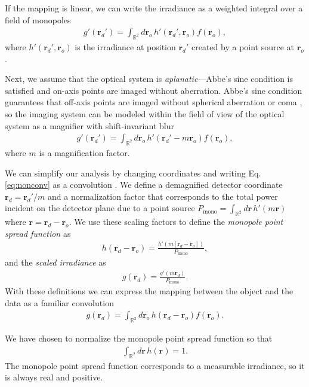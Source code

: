 \documentclass[]{osa-article}
\providecommand{\mb}[1]{\mathbf{#1}}
\providecommand{\ro}{\mathbf{\mathbf{r}}_o}
\providecommand{\rd}{\mathbf{r}_d}
\providecommand{\mbb}[1]{\mathbb{#1}}
\begin{document}
If the mapping is linear, we can write the irradiance as a weighted integral
over a field of monopoles
\begin{align}
g'(\rd') = \int_{\mbb{R}^2}d\ro\, h'(\rd',\ro)f(\ro), \label{eq:fwdmono}
\end{align}
where $h'(\rd', \ro{})$ is the irradiance at position $\rd'$ created by a
point source at $\ro$.

Next, we assume that the optical system is \textit{aplanatic}---Abbe's sine
condition is satisfied and on-axis points are imaged without aberration. Abbe's
sine condition guarantees that off-axis points are imaged without spherical
aberration or coma \cite[ch.~1]{mansuripur2009}, so the imaging system can
be modeled within the field of view of the optical system as a magnifier with
shift-invariant blur
\begin{align}
  g'(\rd') = \int_{\mbb{R}^2}d\ro\, h'(\rd' - m\ro)f(\ro), \label{eq:nonconv}
\end{align}
where $m$ is a magnification factor. 

We can simplify our analysis by changing coordinates and writing Eq.
\eqref{eq:nonconv} as a convolution \cite[ch.~7.2.7]{barrett2004}. We
define a demagnified detector coordinate $\rd = \rd'/m$ and a normalization
factor that corresponds to the total power incident on the detector plane due to
a point source $P_{\text{mono}} = \int_{\mbb{R}^2}d\mb{r}\,h'(m\mb{r})$ where
$\mb{r} = \rd - \ro$. We use these scaling factors to define the
\textit{monopole point spread function} as
\begin{align}
  h(\rd - \ro) = \frac{h'(m[\rd - \ro])}{P_{\text{mono}}},
\end{align}
and the \textit{scaled irradiance} as
\begin{align}
  g(\rd) = \frac{g'(m\rd)}{P_{\text{mono}}}.
\end{align}
With these definitions we can express the mapping between the object and the
data as a familiar convolution
\begin{align}
  g(\rd) = \int_{\mbb{R}^2}d\ro\, h(\rd - \ro)f(\ro).  \label{eq:lsi}
\end{align}

We have chosen to normalize the monopole point spread function so that
\begin{align}
  \int_{\mbb{R}^2}d\mb{r}\, h(\mb{r}) = 1. \label{eq:norm}
\end{align}
The monopole point spread function corresponds to a measurable irradiance, so it
is always real and positive.
\end{document}
